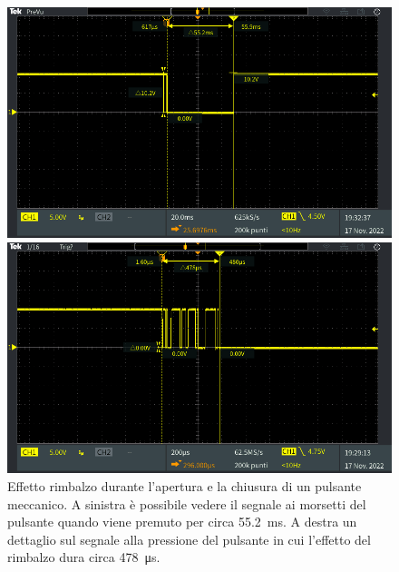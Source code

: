 \begin{figure}[tbh]
	\centering
	\begin{minipage}{.496\textwidth}
		\includegraphics[width=\linewidth]{./ImageFiles/Laboratorio 5/TEK00003.PNG}
	\end{minipage}
	\begin{minipage}{.496\textwidth}
		\includegraphics[width=\linewidth]{./ImageFiles/Laboratorio 5/TEK00002.PNG}
	\end{minipage}
	\caption{Effetto rimbalzo durante l'apertura e la chiusura di un pulsante meccanico. A sinistra è possibile vedere il segnale ai morsetti del pulsante quando viene premuto per circa \SI{55.2}{\milli\second}. A destra un dettaglio sul segnale alla pressione del pulsante in cui l'effetto del rimbalzo dura circa \SI{478}{\micro\second}.}
	\label{fig:switch_bouncing}
\end{figure}
